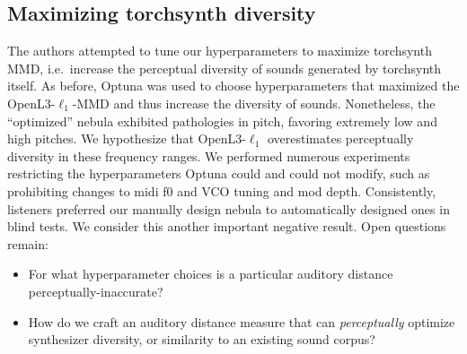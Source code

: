 \subsection{Maximizing torchsynth diversity}
\label{sec:diversity}

The authors attempted to tune our hyperparameters to maximize torchsynth MMD, i.e.\ increase the perceptual diversity of sounds generated by torchsynth itself. As before, Optuna was used to choose hyperparameters that maximized the OpenL3-$\ell_1$-MMD and thus increase the diversity of sounds. Nonetheless, the ``optimized'' nebula exhibited pathologies in pitch, favoring extremely low and high pitches. We hypothesize that OpenL3-$\ell_1$ overestimates perceptually diversity in these frequency ranges. We performed numerous experiments restricting the hyperparameters Optuna could and could not modify, such as prohibiting changes to midi f0 and VCO tuning and mod depth. Consistently, listeners preferred our manually design nebula to automatically designed ones in blind tests. We consider this another important negative result. Open questions remain:
\begin{itemize}
    \item For what hyperparameter choices is a particular auditory distance perceptually-inaccurate?
    \item How do we craft an auditory distance measure that can {\em perceptually} optimize synthesizer diversity, or similarity to an existing sound corpus?
\end{itemize} 

